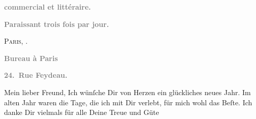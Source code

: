 \pstart
           \begin{otherlanguage}{french}\textcolor{gray}{\textbf{commercial et littéraire.}}\end{otherlanguage}\pend
           
\pstart
           \begin{otherlanguage}{french}\textcolor{gray}{\textbf{\textbf{Paraissant trois fois par jour.}}}\end{otherlanguage}\hfill \textsc{Paris}, \label{K_L02792-1v}\label{K_L02792-1}.\pend
           
\pstart
           \begin{otherlanguage}{french}\textcolor{gray}{\textbf{\textbf{Bureau à Paris}}}\end{otherlanguage}\pend
           
\pstart
           \begin{otherlanguage}{french}\textcolor{gray}{\textbf{\textbf{24. Rue Feydeau.}}}\end{otherlanguage}\pend
           
\pstart{}Mein lieber Freund,\pend\vspace{0.5em}
\pstart
           Ich wünſche Dir von Herzen ein glückliches neues Jahr. Im
               alten Jahr waren die Tage, die ich mit Dir verlebt, für mich
               wohl das Beſte. Ich danke Dir \strikeout{\textcolor{gray}{×}\-\textcolor{gray}{×}\-\textcolor{gray}{×}} vielmals für alle Deine Treue und Güte{\dotsseven}\pend
           
